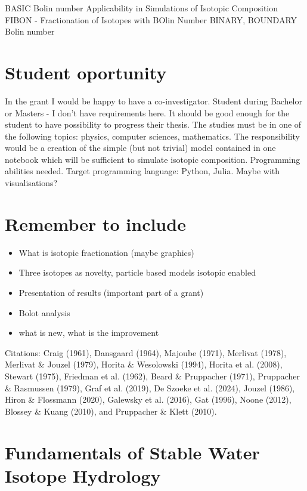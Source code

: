 \documentclass[11pt,a4paper]{article}
\begin{document}
BASIC
Bolin number Applicability in Simulations of Isotopic Composition
FIBON - Fractionation of Isotopes with BOlin Number
BINARY, BOUNDARY
Bolin number 

\section{Student oportunity}
In the grant I would be happy to have a co-investigator. 
Student during Bachelor or Masters - I don't have requirements here.
It should be good enough for the student to have possibility to progress their thesis.
The studies must be in one of the following topics: physics, computer sciences, mathematics.
The responsibility would be a creation of the simple (but not trivial) model contained in one notebook 
which will be sufficient to simulate isotopic composition.
Programming abilities needed.
Target programming language: Python, Julia. 
Maybe with visualisations? 


\section{Remember to include}
\begin{itemize}
    \item What is isotopic fractionation (maybe graphics)
    \item Three isotopes as novelty, particle based models isotopic enabled
    \item Presentation of results (important part of a grant)
    \item Bolot analysis
    \item what is new, what is the improvement
\end{itemize}

Citations:
Craig (1961), Dansgaard (1964), Majoube (1971), Merlivat (1978), Merlivat \& Jouzel (1979),
Horita \& Wesolowski (1994), Horita et al. (2008), Stewart (1975), Friedman et al. (1962),
Beard \& Pruppacher (1971), Pruppacher \& Rasmussen (1979), Graf et al. (2019),
De Szoeke et al. (2024), Jouzel (1986), Hiron \& Flossmann (2020), Galewsky et al. (2016),
Gat (1996), Noone (2012), Blossey \& Kuang (2010), and Pruppacher \& Klett (2010).


\section{Fundamentals of Stable Water Isotope Hydrology}
\end{document}
